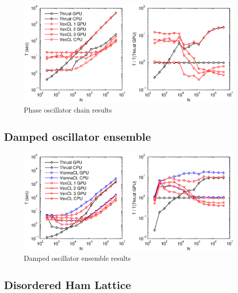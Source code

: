 \documentclass[1p]{elsarticle}
\begin{document}
\begin{figure}
    \begin{center}
	\includegraphics[width=\textwidth]{data/phase_oscillator_chain/phase_oscillator}
    \end{center}
    \caption{Phase oscillator chain results}
    \label{fig:phase:perf}
\end{figure}

\subsection{Damped oscillator ensemble}

\begin{figure}
    \begin{center}
	\includegraphics[width=\textwidth]{data/damped_oscillator/damped_oscillator}
    \end{center}
    \caption{Damped oscillator ensemble results}
    \label{fig:phase:perf}
\end{figure}

\subsection{Disordered Ham Lattice}
\end{document}
